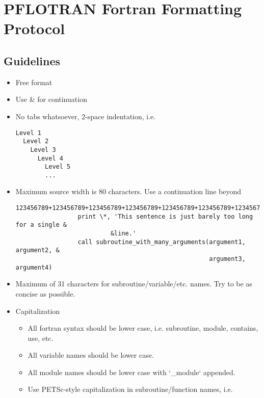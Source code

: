 
\section*{PFLOTRAN Fortran Formatting Protocol}

\subsection*{Guidelines}

\begin{itemize}
\item Free format

\item Use \& for continuation

\item No tabs whatsoever, 2-space indentation, i.e.
\begin{Verbatim}
Level 1
  Level 2
    Level 3
      Level 4
        Level 5
        ...
\end{Verbatim}
\item Maximum source width is 80 characters. Use a continuation line beyond

\begin{Verbatim}
123456789+123456789+123456789+123456789+123456789+123456789+123456789+123456789+
                 print \*, 'This sentence is just barely too long for a single &
                          &line.'
                 call subroutine_with_many_arguments(argument1, argument2, &
                                                     argument3, argument4)
\end{Verbatim}
\item Maximum of 31 characters for subroutine/variable/etc. names. Try to be as concise as possible.

\item Capitalization
\begin{itemize}
\item All fortran syntax should be lower case, i.e. subroutine, module, contains, use, etc.
\item All variable names should be lower case.

\item All module names should be lower case with `\_module` appended.

\item Use PETSc-style capitalization in subroutine/function names, i.e.


\end{itemize}
\end{itemize}
